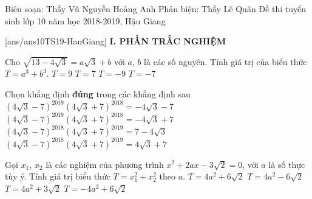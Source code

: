 \begin{name}
{Biên soạn: Thầy Vũ Nguyễn Hoàng Anh \newline Phản biện: Thầy Lê Quân}
{Đề thi tuyển sinh lớp 10 năm học 2018-2019, Hậu Giang}
\end{name}

[ans/ans10TS19-HauGiang]
\noindent\textbf{I. PHẦN TRẮC NGHIỆM}
\setcounter{ex}{0}
\begin{ex}%
Cho $\sqrt{13-4\sqrt{3}}=a\sqrt{3}+b$ với $a$, $b$ là các số nguyên. Tính giá trị của biểu thức $T=a^3+b^3$.
\choice
{$T=9$}
{\True $T=7$}
{$T=-9$}
{$T=-7$}
\end{ex}

\begin{ex}%
Chọn khẳng định \textbf{đúng} trong các khẳng định sau
\choice
{$\left(4\sqrt{3}-7\right)^{2019}\left( 4\sqrt{3}+7 \right)^{2018}=-4\sqrt{3}-7$}
{$\left(4\sqrt{3}-7\right)^{2019}\left( 4\sqrt{3}+7 \right)^{2018}=-4\sqrt{3}+7$}
{$\left(4\sqrt{3}-7\right)^{2018}\left( 4\sqrt{3}+7 \right)^{2019}=7-4\sqrt{3}$}
{\True $\left(4\sqrt{3}-7\right)^{2018}\left( 4\sqrt{3}+7 \right)^{2019}=4\sqrt{3}+7$}
\end{ex}

\begin{ex}%
Gọi $x_1$, $x_2$ là các nghiệm của phương trình $x^2+2ax-3\sqrt{2}=0$, với $a$ là số thực tùy ý. Tính giá trị biểu thức $T=x_1^2+x_2^2$ theo $a$.
\choice
{\True $T=4a^2+6\sqrt{2}$}
{$T=4a^2-6\sqrt{2}$}
{$T=4a^2+3\sqrt{2}$}
{$T=-4a^2+6\sqrt{2}$}
\end{ex}

